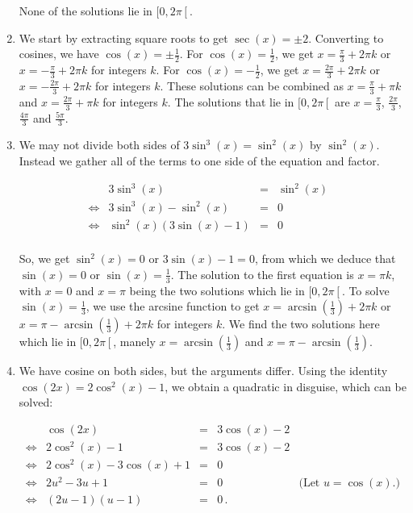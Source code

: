 \begin{example}
\begin{enumerate}
		None of the solutions  lie in $[0,2\pi\left[\right.$. 
		
		\item We start by extracting square roots to get $\sec(x) = \pm 2$. Converting to cosines, we have  $\cos(x) = \pm \frac{1}{2}$.  For $\cos(x) = \frac{1}{2}$, we get $x = \frac{\pi}{3} + 2\pi k$ or $x = -\frac{\pi}{3} + 2\pi k$ for integers $k$.  For $\cos(x) = -\frac{1}{2}$, we get $x = \frac{2\pi}{3} + 2\pi k$ or $x = -\frac{2\pi}{3} + 2\pi k$ for integers $k$.  These solutions can be combined as $x = \frac{\pi}{3} + \pi k$ and $x = \frac{2\pi}{3} + \pi k$ for integers $k$.   The solutions that lie in $[0,2\pi\left[\right.$ are $x = \frac{\pi}{3}$, $\frac{2\pi}{3}$, $\frac{4\pi}{3}$ and $\frac{5\pi}{3}$.  
		
		
		\item We may not divide both sides of $3\sin^{3}(x) = \sin^{2}(x)$ by $\sin^{2}(x)$. Instead we gather all of the terms to one side of the equation and factor.
		
		\[ \begin{array}{rrclr}
		
		&3\sin^{3}(x) & = &  \sin^{2}(x) & \\
		\Leftrightarrow&3\sin^{3}(x) -  \sin^{2}(x) & = & 0 &  \\
		\Leftrightarrow&\sin^{2}(x) (3 \sin(x) - 1) & = & 0 & \\
\end{array} \]
		
		So, we get $\sin^{2}(x) = 0$ or $3\sin(x) - 1 = 0$, from which we deduce that  $\sin(x) = 0$ or $\sin(x) = \frac{1}{3}$.  The solution to the first equation is $x = \pi k$, with $x = 0$ and $x = \pi$ being the two solutions which lie in $[0,2\pi\left[\right.$.  To solve $\sin(x) = \frac{1}{3}$, we use the arcsine function to get $x = \arcsin\left(\frac{1}{3}\right) + 2\pi k$ or $x = \pi - \arcsin\left(\frac{1}{3}\right) + 2\pi k$ for integers $k$. We find the two solutions here which lie in $[0,2\pi\left[\right.$, manely $x = \arcsin\left(\frac{1}{3}\right)$ and $x = \pi - \arcsin\left(\frac{1}{3}\right)$.  
		
		\item We have  cosine on both sides, but the arguments differ.  Using the identity $\cos(2x) = 2\cos^{2}(x) - 1$, we obtain a quadratic in disguise, which can be solved:
		
		\[ \begin{array}{rrclr}
		
		&\cos(2x) & = & 3\cos(x) - 2 & \\
		\Leftrightarrow&2\cos^{2}(x) -1 & = & 3\cos(x) -2 & \\%
		\Leftrightarrow&2\cos^{2}(x) - 3\cos(x) +1 & = & 0 & \\
		\Leftrightarrow&2 u^2 - 3 u + 1 & = & 0 & \text{(Let $u = \cos(x)$.)}\\
		\Leftrightarrow&(2u - 1)(u - 1) & = & 0\,. & \\ \end{array} \]
		

\end{enumerate}
\end{example}
